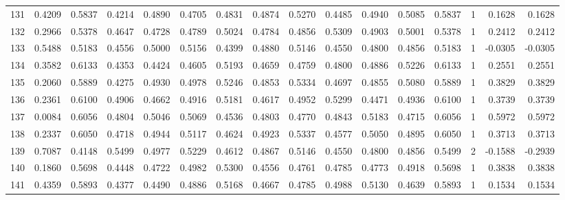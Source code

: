 \begin{tabular}{lrrrrrrrrrrrrrrr}
131 &      0.4209 &  0.5837 &  0.4214 &  0.4890 &  0.4705 &  0.4831 &  0.4874 &  0.5270 &  0.4485 &  0.4940 &   0.5085 &     0.5837 &      1 &                    0.1628 &                     0.1628 \\
132 &      0.2966 &  0.5378 &  0.4647 &  0.4728 &  0.4789 &  0.5024 &  0.4784 &  0.4856 &  0.5309 &  0.4903 &   0.5001 &     0.5378 &      1 &                    0.2412 &                     0.2412 \\
133 &      0.5488 &  0.5183 &  0.4556 &  0.5000 &  0.5156 &  0.4399 &  0.4880 &  0.5146 &  0.4550 &  0.4800 &   0.4856 &     0.5183 &      1 &                   -0.0305 &                    -0.0305 \\
134 &      0.3582 &  0.6133 &  0.4353 &  0.4424 &  0.4605 &  0.5193 &  0.4659 &  0.4759 &  0.4800 &  0.4886 &   0.5226 &     0.6133 &      1 &                    0.2551 &                     0.2551 \\
135 &      0.2060 &  0.5889 &  0.4275 &  0.4930 &  0.4978 &  0.5246 &  0.4853 &  0.5334 &  0.4697 &  0.4855 &   0.5080 &     0.5889 &      1 &                    0.3829 &                     0.3829 \\
136 &      0.2361 &  0.6100 &  0.4906 &  0.4662 &  0.4916 &  0.5181 &  0.4617 &  0.4952 &  0.5299 &  0.4471 &   0.4936 &     0.6100 &      1 &                    0.3739 &                     0.3739 \\
137 &      0.0084 &  0.6056 &  0.4804 &  0.5046 &  0.5069 &  0.4536 &  0.4803 &  0.4770 &  0.4843 &  0.5183 &   0.4715 &     0.6056 &      1 &                    0.5972 &                     0.5972 \\
138 &      0.2337 &  0.6050 &  0.4718 &  0.4944 &  0.5117 &  0.4624 &  0.4923 &  0.5337 &  0.4577 &  0.5050 &   0.4895 &     0.6050 &      1 &                    0.3713 &                     0.3713 \\
139 &      0.7087 &  0.4148 &  0.5499 &  0.4977 &  0.5229 &  0.4612 &  0.4867 &  0.5146 &  0.4550 &  0.4800 &   0.4856 &     0.5499 &      2 &                   -0.1588 &                    -0.2939 \\
140 &      0.1860 &  0.5698 &  0.4448 &  0.4722 &  0.4982 &  0.5300 &  0.4556 &  0.4761 &  0.4785 &  0.4773 &   0.4918 &     0.5698 &      1 &                    0.3838 &                     0.3838 \\
141 &      0.4359 &  0.5893 &  0.4377 &  0.4490 &  0.4886 &  0.5168 &  0.4667 &  0.4785 &  0.4988 &  0.5130 &   0.4639 &     0.5893 &      1 &                    0.1534 &                     0.1534 \\

\end{tabular}

